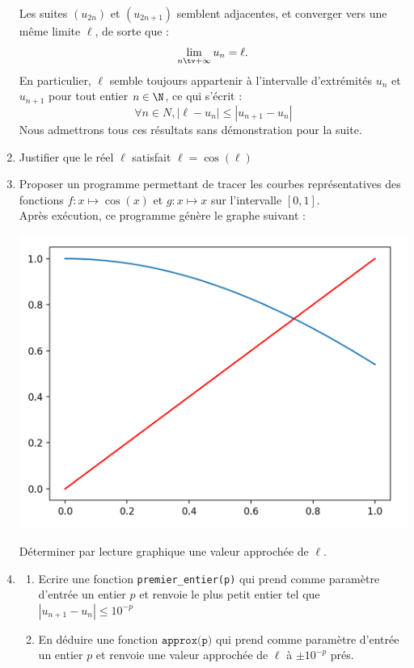 \begin{probleme}[Informatique]
\begin{enumerate}
\begin{minipage}[t]{0.4 \textwidth}
\end{minipage}
\hfill\vline\hfill
\begin{minipage}[t]{0.5 \textwidth}
Les suites $(u_{2n})$ et $(u_{2n+1})$ semblent adjacentes, et converger vers une même limite $\ell$, de sorte que :
$$\lim_{n\tv +\infty} u_n =\ell.$$
En particulier, $\ell$ semble toujours appartenir à l'intervalle d'extrémités $u_n$ et $u_{n+1}$ pour tout entier $n\in \N$, ce qui s'écrit :
$$\forall n\in N, |\ell - u_n| \leq |u_{n+1} - u_n|$$
Nous admettrons tous ces résultats sans démonstration pour la suite. 
\end{minipage}
\item Justifier que le réel $\ell$ satisfait $\ell = \cos(\ell)$ 
\item Proposer un programme permettant de tracer les courbes représentatives des fonctions $f : x\mapsto \cos(x)$ et $g : x \mapsto x$ sur l'intervalle $[0,1]$. \\
Après exécution, ce programme génère le graphe suivant : 
\begin{center}
\includegraphics[scale=0.4]{cos}
\end{center}
Déterminer par lecture graphique une valeur approchée de $\ell$. 
\item \begin{enumerate}
\item Ecrire une fonction \texttt{premier\_entier(p)} qui prend comme paramètre d'entrée un entier $p$ et renvoie le plus petit entier tel que $|u_{n+1} - u_n| \leq 10^{-p}$
\item En déduire une fonction $\texttt{approx(p)}$ qui prend comme paramètre d'entrée un entier $p$ et renvoie une valeur approchée de $\ell $ à $\pm 10^{-p}$ prés. 

\end{enumerate}
\end{enumerate}
\end{probleme}
